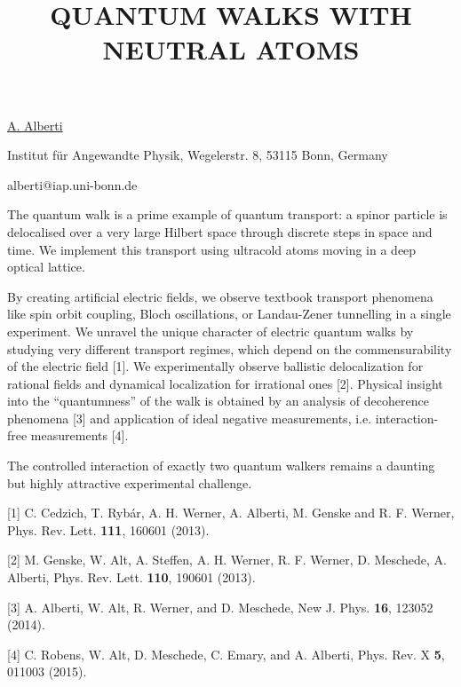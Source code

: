 \title{QUANTUM WALKS WITH NEUTRAL ATOMS}

\underline{A. Alberti} 

{\normalsize{\vspace{-4mm}
Institut f\"ur Angewandte Physik,
Wegelerstr. 8,
53115 Bonn, Germany

\email alberti@iap.uni-bonn.de}}

The quantum walk is a prime example of quantum transport: a spinor particle is delocalised
over a very large Hilbert space through discrete steps in space and time. We implement this
transport using ultracold atoms moving in a deep optical lattice.

By creating artificial electric fields, we observe textbook transport phenomena like spin
orbit coupling, Bloch oscillations, or Landau-Zener tunnelling in a single experiment. We
unravel the unique character of electric quantum walks by studying very different transport
regimes, which depend on the commensurability of the electric field [1]. We experimentally
observe ballistic delocalization for rational fields and dynamical localization for irrational
ones [2]. Physical insight into the ``quantumness'' of the walk is obtained by an analysis of
decoherence phenomena [3] and application of ideal negative measurements, i.e. interaction-free
measurements [4].

The controlled interaction of exactly two quantum walkers remains a daunting but highly
attractive experimental challenge.

{\normalsize
[1] C. Cedzich, T. Ryb\'{a}r, A. H. Werner, A. Alberti, M. Genske and R. F. Werner, Phys. Rev. Lett. \textbf{111}, 160601 (2013).
\vsp

[2] M. Genske, W. Alt, A. Steffen, A. H. Werner, R. F. Werner, D. Meschede, A. Alberti, Phys. Rev. Lett. \textbf{110}, 190601 (2013).
\vsp

[3] A. Alberti, W. Alt, R. Werner, and D. Meschede, New J. Phys. \textbf{16}, 123052 (2014).
\vsp

[4] C. Robens, W. Alt, D. Meschede, C. Emary, and A. Alberti, Phys. Rev. X \textbf{5}, 011003 (2015).
}

\vspace{\baselineskip}
